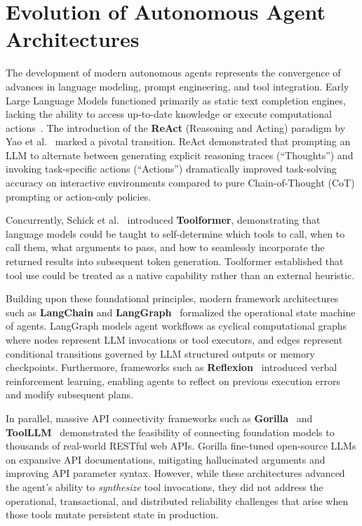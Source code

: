 \section{Evolution of Autonomous Agent Architectures}
\label{sec:lit_agents}
The development of modern autonomous agents represents the convergence of advances in language modeling, prompt engineering, and tool integration. Early Large Language Models functioned primarily as static text completion engines, lacking the ability to access up-to-date knowledge or execute computational actions~\cite{wei2022chain}. The introduction of the \textbf{ReAct} (Reasoning and Acting) paradigm by Yao et al.~\cite{yao2022react} marked a pivotal transition. ReAct demonstrated that prompting an LLM to alternate between generating explicit reasoning traces (``Thoughts'') and invoking task-specific actions (``Actions'') dramatically improved task-solving accuracy on interactive environments compared to pure Chain-of-Thought (CoT) prompting or action-only policies.

Concurrently, Schick et al.~\cite{schick2023toolformer} introduced \textbf{Toolformer}, demonstrating that language models could be taught to self-determine which tools to call, when to call them, what arguments to pass, and how to seamlessly incorporate the returned results into subsequent token generation. Toolformer established that tool use could be treated as a native capability rather than an external heuristic.

Building upon these foundational principles, modern framework architectures such as \textbf{LangChain} and \textbf{LangGraph}~\cite{chase2022langchain} formalized the operational state machine of agents. LangGraph models agent workflows as cyclical computational graphs where nodes represent LLM invocations or tool executors, and edges represent conditional transitions governed by LLM structured outputs or memory checkpoints. Furthermore, frameworks such as \textbf{Reflexion}~\cite{shinn2023reflexion} introduced verbal reinforcement learning, enabling agents to reflect on previous execution errors and modify subsequent plans.

In parallel, massive API connectivity frameworks such as \textbf{Gorilla}~\cite{patil2023gorilla} and \textbf{ToolLLM}~\cite{qin2023toolllm} demonstrated the feasibility of connecting foundation models to thousands of real-world RESTful web APIs. Gorilla fine-tuned open-source LLMs on expansive API documentations, mitigating hallucinated arguments and improving API parameter syntax. However, while these architectures advanced the agent's ability to \textit{synthesize} tool invocations, they did not address the operational, transactional, and distributed reliability challenges that arise when those tools mutate persistent state in production.


